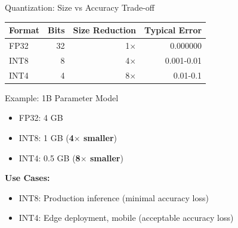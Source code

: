 \documentclass[aspectratio=169,10pt]{beamer}
\begin{document}
\begin{frame}{Quantization: Size vs Accuracy Trade-off}
    \begin{table}
        \centering
        \small
        \begin{tabular}{lrrr}
            \toprule
            \textbf{Format} & \textbf{Bits} & \textbf{Size Reduction} & \textbf{Typical Error} \\
            \midrule
            FP32 & 32 & 1$\times$ & 0.000000 \\
            INT8 & 8 & 4$\times$ & ~0.001-0.01 \\
            INT4 & 4 & 8$\times$ & ~0.01-0.1 \\
            \bottomrule
        \end{tabular}
    \end{table}

    \vspace{0.5cm}
    \begin{block}{Example: 1B Parameter Model}
        \begin{itemize}
            \item FP32: 4 GB
            \item INT8: 1 GB (\textbf{4$\times$ smaller})
            \item INT4: 0.5 GB (\textbf{8$\times$ smaller})
        \end{itemize}
    \end{block}

    \vspace{0.5cm}
    \textbf{Use Cases:}
    \begin{itemize}
        \item INT8: Production inference (minimal accuracy loss)
        \item INT4: Edge deployment, mobile (acceptable accuracy loss)
    \end{itemize}
\end{frame}
\end{document}
